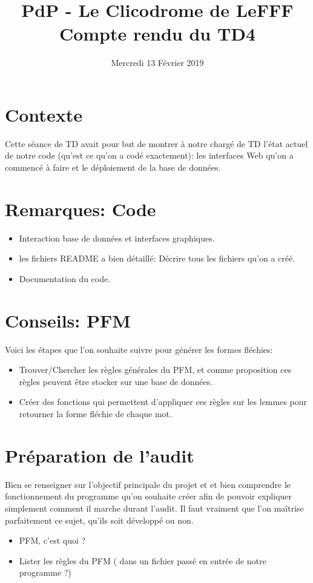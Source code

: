 \documentclass{article}
\title{PdP - Le Clicodrome de LeFFF \\ Compte rendu du TD4}
\author{}
\date{Mercredi 13 Février 2019}
\begin{document}
\maketitle

\section{Contexte}
Cette séance de TD avait pour but de montrer à notre chargé de TD l'état actuel de notre code (qu'est ce qu'on a codé exactement): les interfaces Web qu'on a commencé à faire et le déploiement de la base de données. 

\section{Remarques: Code}
\begin{itemize}
    \item Interaction base de données et interfaces graphiques.
    \item les fichiers README a bien détaillé: Décrire tous les fichiers qu'on a créé.
    \item Documentation du code.
\end{itemize}

\section{Conseils: PFM}
Voici les étapes que l'on souhaite suivre pour générer les formes fléchies:
\begin{itemize}
    \item Trouver/Chercher les règles générales du PFM, et comme proposition ces règles peuvent être stocker sur une base de données.
    \item Créer des fonctions qui permettent d'appliquer ces règles sur les lemmes pour retourner la forme fléchie de chaque mot.
\end{itemize}

\section{Préparation de l'audit}
\smallbreak Bien se renseigner sur l'objectif principale du projet et et bien comprendre le fonctionnement du programme qu'on souhaite créer afin de pouvoir expliquer simplement comment il marche durant l'audit.
Il faut vraiment que l'on maîtrise parfaitement ce sujet, qu'ils soit développé ou non.
\begin{itemize}
    \item PFM, c'est quoi ?
    \item Lister les règles du PFM ( dans un fichier passé en entrée de notre programme ?)
  
\end{itemize}
\end{document}
